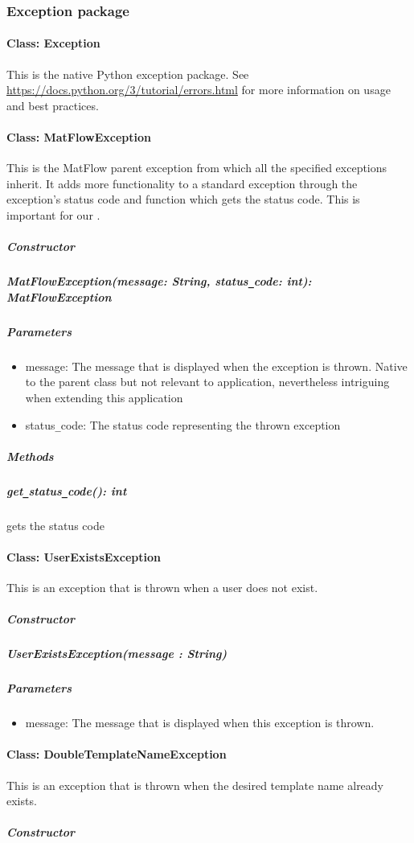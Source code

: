 \subsubsection{Exception package}

\paragraph{Class: Exception}
This is the native Python exception package. See \url{https://docs.python.org/3/tutorial/errors.html} 
for more information on usage and best practices.

\paragraph{Class: MatFlowException}
This is the MatFlow parent exception from which all the specified exceptions inherit. It adds more functionality to 
a standard exception through the exception's status code and function which gets the status code. This is important for our
.
\subparagraph{Constructor}
\subparagraph{MatFlowException(message: String, status\texttt{\_}code: int): MatFlowException}
\subparagraph{Parameters}
\begin{itemize}
	\item{message:}
	The message that is displayed when the exception is thrown. Native to the parent class but not relevant to application,
    nevertheless intriguing when extending this application 
    \item{status\texttt{\_}code:}
	The status code representing the thrown exception
\end{itemize}

\subparagraph{Methods}
\subparagraph{get\texttt{\_}status\texttt{\_}code(): int}
gets the status code


\paragraph{Class: UserExistsException}
This is an exception that is thrown when a user does not exist.
\subparagraph{Constructor}

\subparagraph{UserExistsException(message : String)}
\subparagraph{Parameters}
\begin{itemize}
    \item{message:}
    The message that is displayed when this exception is thrown.
\end{itemize}

\paragraph{Class: DoubleTemplateNameException}
This is an exception that is thrown when the desired template name already exists.
\subparagraph{Constructor}

